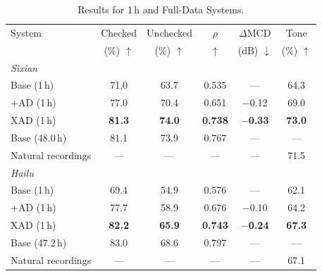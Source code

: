 \documentclass[conference,a4paper]{IEEEtran}
\begin{document}
\begin{table}[H]
\centering
\caption{Results for 1\,h and Full-Data Systems.}
\label{tab:main}
\footnotesize
\setlength{\tabcolsep}{3.6pt}
\begin{tabular}{lccccc}
\toprule
System & Checked & Unchecked & $\rho$ & $\Delta$MCD & Tone \\
 & (\%) $\uparrow$ & (\%) $\uparrow$ & $\uparrow$ & (dB) $\downarrow$ & (\%) $\uparrow$ \\
\midrule
\multicolumn{6}{l}{\textit{Sixian}} \\
Base (1\,h)       & 71.0 & 63.7 & 0.535 & ---            & 64.3 \\
+AD (1\,h)        & 77.0 & 70.4 & 0.651 & $-$0.12        & 69.0 \\
XAD (1\,h)        & \textbf{81.3} & \textbf{74.0} & \textbf{0.738} & \textbf{$-$0.33} & \textbf{73.0} \\
Base (48.0\,h)    & 81.1 & 73.9 & 0.767 & ---            & ---  \\
Natural recordings & ---  & ---  & ---   & ---            & 71.5 \\
\midrule
\multicolumn{6}{l}{\textit{Hailu}} \\
Base (1\,h)       & 69.4 & 54.9 & 0.576 & ---            & 62.1 \\
+AD (1\,h)        & 77.7 & 58.9 & 0.676 & $-$0.10        & 64.2 \\
XAD (1\,h)        & \textbf{82.2} & \textbf{65.9} & \textbf{0.743} & \textbf{$-$0.24} & \textbf{67.3} \\
Base (47.2\,h)    & 83.0 & 68.6 & 0.797 & ---            & ---  \\
Natural recordings & ---  & ---  & ---   & ---            & 67.1 \\
\bottomrule
\end{tabular}
\end{table}
\end{document}
